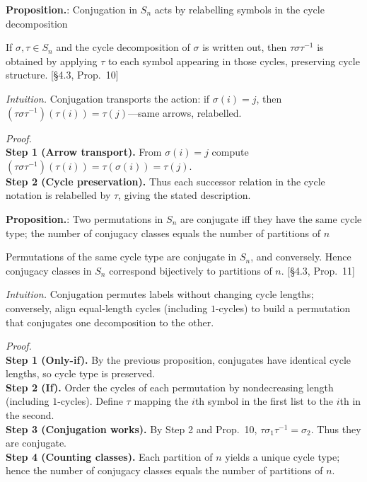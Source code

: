 \documentclass[12pt]{article}
\theoremstyle{definition}
\begin{document}
\newpage


\noindent\textbf{Proposition.}: Conjugation in $S_n$ acts by relabelling symbols in the cycle decomposition

\newpage

If $\sigma,\tau\in S_n$ and the cycle decomposition of $\sigma$ is written out, then $\tau\sigma\tau^{-1}$ is obtained by applying $\tau$ to each symbol appearing in those cycles, preserving cycle structure. \hfill {\footnotesize [§4.3, Prop.~10]}\\

\dotfill

\emph{Intuition.} Conjugation transports the action: if $\sigma(i)=j$, then $(\tau\sigma\tau^{-1})(\tau(i))=\tau(j)$—same arrows, relabelled.

\dotfill

\emph{Proof.}\\
\textbf{Step 1 (Arrow transport).} From $\sigma(i)=j$ compute $(\tau\sigma\tau^{-1})(\tau(i))=\tau(\sigma(i))=\tau(j)$.\\
\textbf{Step 2 (Cycle preservation).} Thus each successor relation in the cycle notation is relabelled by $\tau$, giving the stated description.\\

\newpage


\noindent\textbf{Proposition.}: Two permutations in $S_n$ are conjugate iff they have the same cycle type; the number of conjugacy classes equals the number of partitions of $n$

\newpage

Permutations of the same cycle type are conjugate in $S_n$, and conversely. Hence conjugacy classes in $S_n$ correspond bijectively to partitions of $n$. \hfill {\footnotesize [§4.3, Prop.~11]}\\

\dotfill

\emph{Intuition.} Conjugation permutes labels without changing cycle lengths; conversely, align equal-length cycles (including $1$-cycles) to build a permutation that conjugates one decomposition to the other.

\dotfill

\emph{Proof.}\\
\textbf{Step 1 (Only-if).} By the previous proposition, conjugates have identical cycle lengths, so cycle type is preserved.\\
\textbf{Step 2 (If).} Order the cycles of each permutation by nondecreasing length (including $1$-cycles). Define $\tau$ mapping the $i$th symbol in the first list to the $i$th in the second.\\
\textbf{Step 3 (Conjugation works).} By Step 2 and Prop.~10, $\tau\sigma_1\tau^{-1}=\sigma_2$. Thus they are conjugate.\\
\textbf{Step 4 (Counting classes).} Each partition of $n$ yields a unique cycle type; hence the number of conjugacy classes equals the number of partitions of $n$.\\
\end{document}
